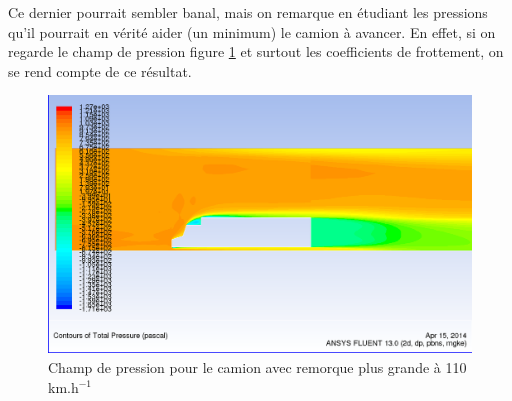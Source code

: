 Ce dernier pourrait sembler banal, mais on remarque en étudiant les pressions qu'il pourrait en vérité aider (un minimum) le camion à avancer. En effet, si on regarde le champ de pression figure \ref{figRem2Pres110} et surtout les coefficients de frottement, on se rend compte de ce résultat.
\begin{figure}[!h]
\centering
\includegraphics[scale=0.4]{resultsCx/remorque2-110_pressure.png}
\caption{Champ de pression pour le camion avec remorque plus grande à 110 km.h$^{-1}$}
\label{figRem2Pres110}
\end{figure}

